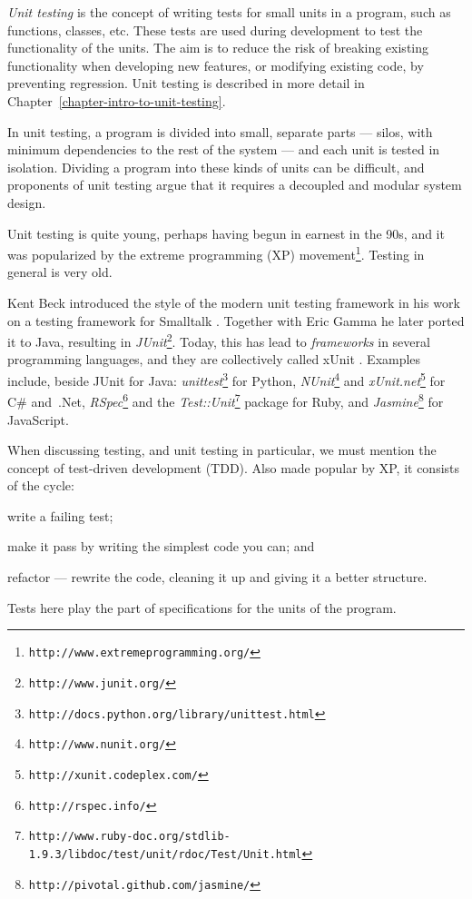 \documentclass[a4paper,11pt]{kth-mag}
\begin{document}
\textit{Unit testing} is the concept of writing tests for small units in a
program, such as functions, classes, etc. These tests are used during
development to test the functionality of the units. The aim is to reduce the
risk of breaking existing functionality when developing new features, or
modifying existing code, by preventing regression. Unit testing is described in
more detail in Chapter~\ref{chapter-intro-to-unit-testing}.

In unit testing, a program is divided into small, separate parts --- silos,
with minimum dependencies to the rest of the system --- and each unit is tested
in isolation. Dividing a program into these kinds of units can be difficult,
and proponents of unit testing argue that it requires a decoupled and modular
system design.

Unit testing is quite young, perhaps having begun in earnest in the 90s, and it
was popularized by the extreme programming (XP)
movement\footnote{\texttt{http://www.extremeprogramming.org/}}. Testing in
general is very old.

Kent Beck introduced the style of the modern unit testing framework in his work
on a testing framework for Smalltalk \cite{becksmalltalktesting}. Together
with Eric Gamma he later ported it to Java, resulting in
\textit{JUnit}\footnote{\texttt{http://www.junit.org/}}.
Today, this has lead to \textit{frameworks} in several programming languages,
and they are collectively called xUnit \cite{fowlerxunit}. Examples include,
beside JUnit for Java:
\textit{unittest}\footnote{\texttt{http://docs.python.org/library/unittest.html}}
for Python,
\textit{NUnit}\footnote{\texttt{http://www.nunit.org/}} and
\textit{xUnit.net}\footnote{\texttt{http://xunit.codeplex.com/}} for C\#
and~.Net,
\textit{RSpec}\footnote{\texttt{http://rspec.info/}} and the
\textit{Test::Unit}\footnote{\texttt{http://www.ruby-doc.org/stdlib-1.9.3/libdoc/test/unit/rdoc/Test/Unit.html}}
package for Ruby,
and \textit{Jasmine}\footnote{\texttt{http://pivotal.github.com/jasmine/}} for
JavaScript.


When discussing testing, and unit testing in particular, we must mention the
concept of test-driven development (TDD). Also made popular by XP, it consists
of the cycle:
\begin{inparaenum}[1\upshape)]
  \item write a failing test;
  \item make it pass by writing the simplest code you can; and
  \item refactor --- rewrite the code, cleaning it up and giving it a better
    structure.
\end{inparaenum}
Tests here play the part of specifications for the units of the program.
\end{document}
